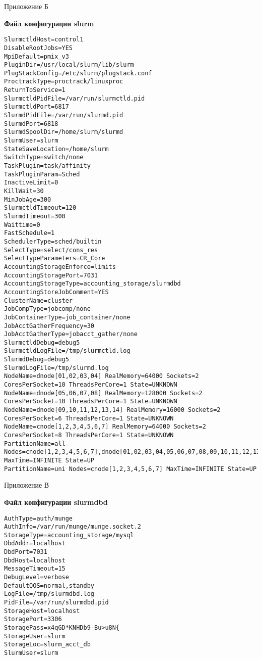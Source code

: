 \documentclass[a4paper]{extarticle}
\begin{document}
\newpage

\begin{flushright}Приложение 	Б\end{flushright}
\centerline{\textbf{Файл конфигурации slurm}}

\begin{verbatim}
SlurmctldHost=control1
DisableRootJobs=YES
MpiDefault=pmix_v3
PluginDir=/usr/local/slurm/lib/slurm
PlugStackConfig=/etc/slurm/plugstack.conf
ProctrackType=proctrack/linuxproc
ReturnToService=1
SlurmctldPidFile=/var/run/slurmctld.pid
SlurmctldPort=6817
SlurmdPidFile=/var/run/slurmd.pid
SlurmdPort=6818
SlurmdSpoolDir=/home/slurm/slurmd
SlurmUser=slurm
StateSaveLocation=/home/slurm
SwitchType=switch/none
TaskPlugin=task/affinity
TaskPluginParam=Sched
InactiveLimit=0
KillWait=30
MinJobAge=300
SlurmctldTimeout=120
SlurmdTimeout=300
Waittime=0
FastSchedule=1
SchedulerType=sched/builtin
SelectType=select/cons_res
SelectTypeParameters=CR_Core
AccountingStorageEnforce=limits
AccountingStoragePort=7031
AccountingStorageType=accounting_storage/slurmdbd
AccountingStoreJobComment=YES
ClusterName=cluster
JobCompType=jobcomp/none
JobContainerType=job_container/none
JobAcctGatherFrequency=30
JobAcctGatherType=jobacct_gather/none
SlurmctldDebug=debug5
SlurmctldLogFile=/tmp/slurmctld.log
SlurmdDebug=debug5
SlurmdLogFile=/tmp/slurmd.log
NodeName=dnode[01,02,03,04] RealMemory=64000 Sockets=2 CoresPerSocket=10 ThreadsPerCore=1 State=UNKNOWN
NodeName=dnode[05,06,07,08] RealMemory=128000 Sockets=2 CoresPerSocket=10 ThreadsPerCore=1 State=UNKNOWN
NodeName=dnode[09,10,11,12,13,14] RealMemory=16000 Sockets=2 CoresPerSocket=6 ThreadsPerCore=1 State=UNKNOWN
NodeName=cnode[1,2,3,4,5,6,7] RealMemory=64000 Sockets=2 CoresPerSocket=8 ThreadsPerCore=1 State=UNKNOWN
PartitionName=all Nodes=cnode[1,2,3,4,5,6,7],dnode[01,02,03,04,05,06,07,08,09,10,11,12,13,14] MaxTime=INFINITE State=UP
PartitionName=uni Nodes=cnode[1,2,3,4,5,6,7] MaxTime=INFINITE State=UP
\end{verbatim}

\newpage

\begin{flushright}Приложение В\end{flushright}
\centerline{\textbf{Файл конфигурации slurmdbd}}

\begin{verbatim}
AuthType=auth/munge
AuthInfo=/var/run/munge/munge.socket.2
StorageType=accounting_storage/mysql
DbdAddr=localhost
DbdPort=7031
DbdHost=localhost
MessageTimeout=15
DebugLevel=verbose
DefaultQOS=normal,standby
LogFile=/tmp/slurmdbd.log
PidFile=/var/run/slurmdbd.pid
StorageHost=localhost
StoragePort=3306
StoragePass=x4qGD*KNHDb9-Bu>u8N{
StorageUser=slurm
StorageLoc=slurm_acct_db
SlurmUser=slurm
\end{verbatim}
\end{document}
